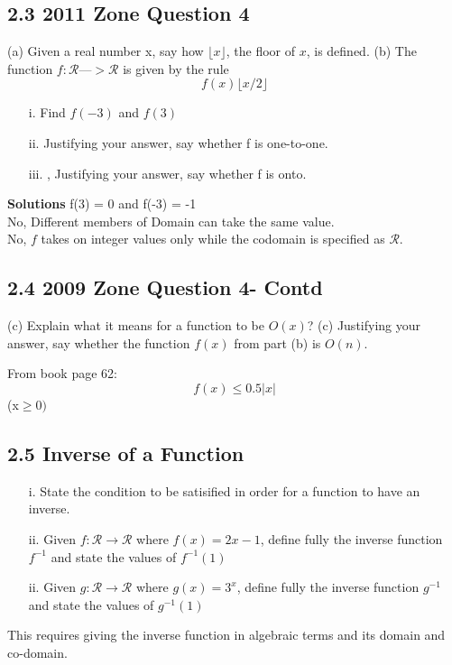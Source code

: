 \documentclass[12 pt]{article}
\begin{document}
\subsection*{2.3 2011 Zone Question 4 }



(a) Given a real number x, say how $\lfloor x \rfloor$, the floor of $x$, is deﬁned.
(b) The function $f : \mathcal{R} —> \mathcal{R}$ is given by the rule
\[f(x) \lfloor x/2 \rfloor\]

\begin{itemize}
\item[ i.] Find $f(-3)$ and $f(3)$ 
\item[ii.] Justifying your answer, say whether f is one-to-one.
\item[iii.], Justifying your answer, say whether f is onto.
\end{itemize}
\textbf{Solutions}
f(3) = 0 and f(-3) = -1\\
No, Different members of Domain can take the same value.\\
No, $f$ takes on integer values only while the codomain
is specified as $\mathcal{R}$.\\
\subsection*{2.4 2009 Zone Question 4- Contd }

(c) Explain what it means for a function to be $O(x)$?
(c) Justifying your answer, say whether the function $
f(x)$ from part (b) is $O(n)$.

From book page 62:
\[ f(x) \leq 0.5 |x|\] (x$\geq 0)$
\newpage
\subsection*{2.5 Inverse of a Function}

\begin{itemize}
\item [i.] State the condition to be satisified in order for a function to have an inverse.
\item [ii.] Given $ f : \mathcal{R} \rightarrow \mathcal{R} $ where $f(x) = 2x-1$, define fully the inverse function $f^{-1}$ 
and state the values of $f^{-1}(1)$
\item [ii.] Given $ g : \mathcal{R} \rightarrow \mathcal{R} $ where $g(x) = 3^x$, define fully the inverse function $g^{-1}$ 
and state the values of $g^{-1}(1)$
\end{itemize}
This requires giving the inverse function in algebraic terms and its domain and co-domain.
\newpage
\end{document}
